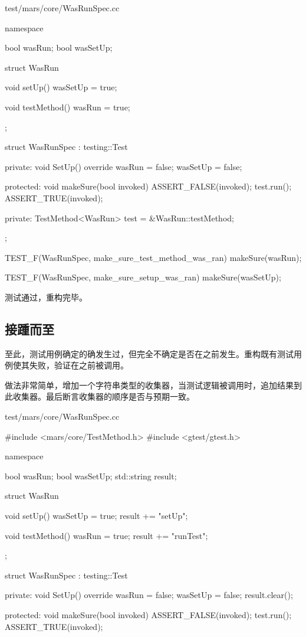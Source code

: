 \begin{content}
\begin{nodiff}{test/mars/core/WasRunSpec.cc}
\begin{c++}
namespace {
  bool wasRun;
  bool wasSetUp;

  struct WasRun {
    void setUp() {
      wasSetUp = true;
    }

    void testMethod() {
      wasRun = true;
    }
  };

  struct WasRunSpec : testing::Test {
  private:
    void SetUp() override {
      wasRun = false;
      wasSetUp = false;
    }

  protected:
    void makeSure(bool invoked) {
      ASSERT_FALSE(invoked);
      test.run();
      ASSERT_TRUE(invoked);      
    }

  private:
    TestMethod<WasRun> test = &WasRun::testMethod;
  };
}

TEST_F(WasRunSpec, make_sure_test_method_was_ran) {
  makeSure(wasRun);
}

TEST_F(WasRunSpec, make_sure_setup_was_ran) {
  makeSure(wasSetUp);
}
\end{c++}
\end{nodiff}

测试通过，重构完毕。

\subsection{接踵而至}

至此，测试用例确定的确发生过，但完全不确定是否在之前发生。重构既有测试用例使其失败，验证在之前被调用。

做法非常简单，增加一个字符串类型的收集器，当测试逻辑被调用时，追加结果到此收集器。最后断言收集器的顺序是否与预期一致。

\begin{nodiff}{test/mars/core/WasRunSpec.cc}
\begin{c++}
#include <mars/core/TestMethod.h>
#include <gtest/gtest.h>

namespace {
  bool wasRun;
  bool wasSetUp;
  std::string result;

  struct WasRun {
    void setUp() {
      wasSetUp = true;
      result += "setUp";
    }

    void testMethod() {
      wasRun = true;
      result += "runTest";
    }
  };

  struct WasRunSpec : testing::Test {
  private:
    void SetUp() override {
      wasRun = false;
      wasSetUp = false;
      result.clear();
    }

  protected:
    void makeSure(bool invoked) {
      ASSERT_FALSE(invoked);
      test.run();
      ASSERT_TRUE(invoked);      
    }

}}
\end{c++}
\end{nodiff}
\end{content}
